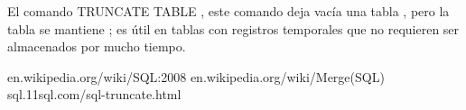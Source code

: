 \documentclass[twoside,twocolumn]{article}
\begin{document}
El comando TRUNCATE TABLE , este comando deja vacía una tabla , pero la tabla se mantiene ; es útil en tablas con registros temporales que no requieren ser almacenados por mucho tiempo.

\begin{thebibliography}{}
\bibitem {}
\newblock en.wikipedia.org/wiki/SQL:2008
\bibitem {}
\newblock en.wikipedia.org/wiki/Merge(SQL)
\bibitem {}
\newblock sql.11sql.com/sql-truncate.html
\end{thebibliography}
\end{document}
